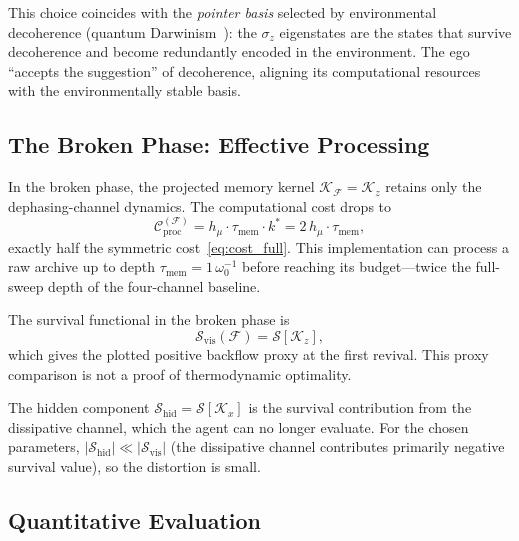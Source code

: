 \documentclass[12pt]{article}
\begin{document}
This choice coincides with the \emph{pointer basis}
selected by environmental decoherence (quantum
Darwinism~\cite{Zurek2009}): the $\sigma_z$ eigenstates
are the states that survive decoherence and become
redundantly encoded in the environment.
The ego ``accepts the suggestion'' of decoherence,
aligning its computational resources with the
environmentally stable basis.

\subsection{The Broken Phase: Effective Processing}
\label{subsec:broken}

In the broken phase, the projected memory kernel
$\mathcal{K}_{\mathcal{F}} = \mathcal{K}_z$ retains only
the dephasing-channel dynamics.
The computational cost drops to
\begin{equation}
\label{eq:cost_broken}
\mathcal{C}_{\mathrm{proc}}^{(\mathcal{F})}
= h_\mu \cdot \tau_{\mathrm{mem}} \cdot k^*
= 2\,h_\mu \cdot \tau_{\mathrm{mem}},
\end{equation}
exactly half the symmetric cost~\eqref{eq:cost_full}.
This implementation can process a raw archive up to depth
$\tau_{\mathrm{mem}} = 1\,\omega_0^{-1}$ before reaching
its budget---twice the full-sweep depth of the four-channel baseline.

The survival functional in the broken phase is
\begin{equation}
\label{eq:S_broken}
\mathcal{S}_{\mathrm{vis}}(\mathcal{F})
= \mathcal{S}[\mathcal{K}_z],
\end{equation}
which gives the plotted positive backflow proxy at the first revival.
This proxy comparison is not a proof of thermodynamic optimality.

The hidden component
$\mathcal{S}_{\mathrm{hid}} = \mathcal{S}[\mathcal{K}_x]$
is the survival contribution from the dissipative channel,
which the agent can no longer evaluate.
For the chosen parameters,
$|\mathcal{S}_{\mathrm{hid}}|
\ll |\mathcal{S}_{\mathrm{vis}}|$
(the dissipative channel contributes primarily negative
survival value), so the distortion is small.

\subsection{Quantitative Evaluation}
\label{subsec:quantitative}
\end{document}
